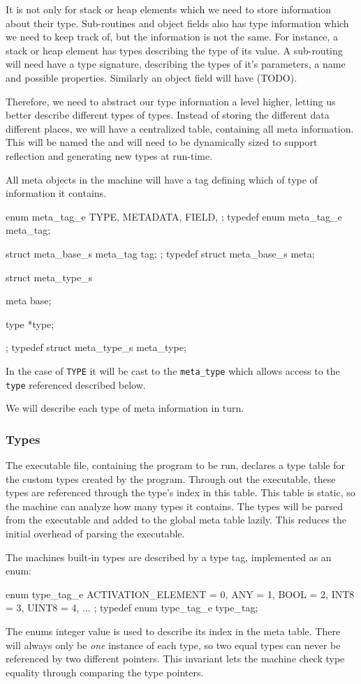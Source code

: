 
It is not only for stack or heap elements which we need to store information
about their type. Sub-routines and object fields also has type information which
we need to keep track of, but the information is not the same. For instance, a
stack or heap element has types describing the type of its value. A sub-routing
will need have a type signature, describing the types of it's parameters, a name
and possible properties. Similarly an object field will have (TODO).

Therefore, we need to abstract our type information a level higher, letting us
better describe different types of types. Instead of storing the different data
different places, we will have a centralized table, containing all meta
information. This will be named the  and will need to be
dynamically sized to support reflection and generating new types at run-time.

All meta objects in the machine will have a tag defining which of type of
information it contains.
\begin{ccode}
enum meta_tag_e {
    TYPE,
    METADATA,
    FIELD,
};
typedef enum meta_tag_e meta_tag;

struct meta_base_s {
    meta_tag tag;
};
typedef struct meta_base_s meta;

struct meta_type_s {
    meta base;

    type *type;
};
typedef struct meta_type_s meta_type;
\end{ccode}
In the case of {\tt TYPE} it will be cast to the {\tt meta\_type} which allows
access to the {\tt type} referenced described below.

We will describe each type of meta information in turn.

\subsubsection{Types}
The executable file, containing the program to be run, declares a type table for
the custom types created by the program. Through out the executable, these types
are referenced through the type's index in this table. This table is static, so
the machine can analyze how many types it contains. The types will be parsed
from the executable and added to the global meta table lazily. This reduces
the initial overhead of parsing the executable.

The machines built-in types are described by a type tag, implemented as an enum:
\begin{ccode}
enum type_tag_e {
    ACTIVATION_ELEMENT = 0,
    ANY                = 1,
    BOOL               = 2,
    INT8               = 3,
    UINT8              = 4,
    ...
};
typedef enum type_tag_e type_tag;
\end{ccode}
The enums integer value is used to describe its index in the meta table. There
will always only be {\it one} instance of each type, so two equal types can
never be referenced by two different pointers. This invariant lets the machine
check type equality through comparing the type pointers.

